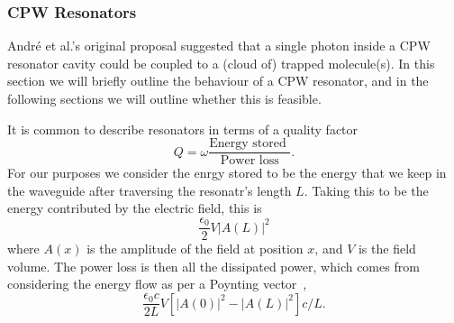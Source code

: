 \subsubsection{CPW Resonators}

Andr\'e et al.'s  original proposal suggested that a
single photon inside a CPW resonator cavity could be coupled to a (cloud of)
trapped molecule(s). In this section we will briefly outline the behaviour of a
CPW resonator, and in the following sections we will outline whether this is
feasible. %

It is common to describe resonators in terms of a quality
factor~\cite{Jackson1975, 1125652}
\begin{equation}
  Q = \omega \frac{\text{Energy stored }}{\text{Power loss}}.
\end{equation}
For our purposes we consider the enrgy stored to be the energy that we keep in
the waveguide after traversing the resonatr's length $L$. Taking this to be the
energy contributed by the electric field, this is
\begin{equation}
  \frac{\epsilon_0}{2} V \lvert A(L) \rvert^2
\end{equation}
where $A(x)$ is the amplitude of the field at position $x$, and $V$ is the field
volume.  The power loss is then all the dissipated power, which comes from
considering the energy flow as per a Poynting vector~\cite{Jackson1975},
\begin{equation}
  \frac{\epsilon_0 c}{2L}V \left[ \lvert A(0) \rvert^2 - \lvert A(L) \rvert^2
  \right] c/L.
\end{equation}

